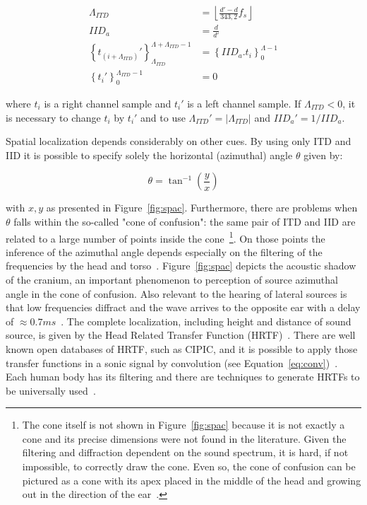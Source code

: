 \begin{equation}\label{eq:locImpl}
\begin{split}
\Lambda_{ITD} & = \left \lfloor \frac{d'-d}{343,2}  f_s \right \rfloor \\
IID_a & = \frac{d}{d'} \\
\left\{t_{(i+\Lambda_{ITD})}'\right\}_{\Lambda_{ITD}}^{\Lambda+\Lambda_{ITD}-1} & =\left\{IID_a . t_i\right\}_0^{\Lambda-1} \\
\left\{t_i'\right\}_0^{\Lambda_{ITD}-1} & = 0
\end{split}
\end{equation}

\noindent where $t_i$ is a right channel sample and $t_i'$ is a left channel sample.
If $\Lambda_{ITD} < 0$, it is necessary to change $t_i$ by $t_i'$
and to use $\Lambda_{ITD}'= | \Lambda_{ITD} | $ and $IID_a'=1 / IID_a$.

Spatial localization depends considerably on other cues. By using only ITD and IID it is possible to specify solely the horizontal (azimuthal) angle $\theta$ given by:

\begin{equation}\label{eq:angulo}
\theta=\tan^{-1}\left ( \frac{y}{ x }  \right )
\end{equation}

\noindent with $x,y$ as presented in Figure~\ref{fig:spac}.
Furthermore, there are problems when $\theta$ falls within the so-called "cone of confusion": the same pair of ITD and IID are related to a large number of points inside the cone~\footnote{The cone itself is not shown in Figure~\ref{fig:spac} because it is not exactly a cone and its precise dimensions were not found in the literature. Given the filtering and diffraction dependent on the sound spectrum, it is hard, if not impossible, to correctly draw the cone. Even so, the cone of confusion can be pictured as a cone with its apex placed in the middle of the head and growing out in the direction of the ear~\cite{hrtf}.}.
On those points the inference of the azimuthal angle depends especially on the filtering of the frequencies by the head and torso~\cite{Heeger,hrtf}.
Figure~\ref{fig:spac} depicts the acoustic shadow of the cranium, an important phenomenon to perception of source azimuthal angle in the cone of confusion. Also relevant to the hearing of lateral sources is that low frequencies diffract and the wave arrives to the opposite ear with a delay of $\approx 0.7ms$~\cite{floEsp}. 
The complete localization, including height and distance of sound source, is given by the Head Related Transfer Function (HRTF)~\cite{hrtf}. There are well known open databases of HRTF, such as CIPIC, and it is possible to apply those transfer functions in a sonic signal by convolution (see Equation~\ref{eq:conv})~\cite{CIPIC}. Each human body has its filtering and there are techniques to generate HRTFs to be universally used~\cite{lazaSPA}. 

